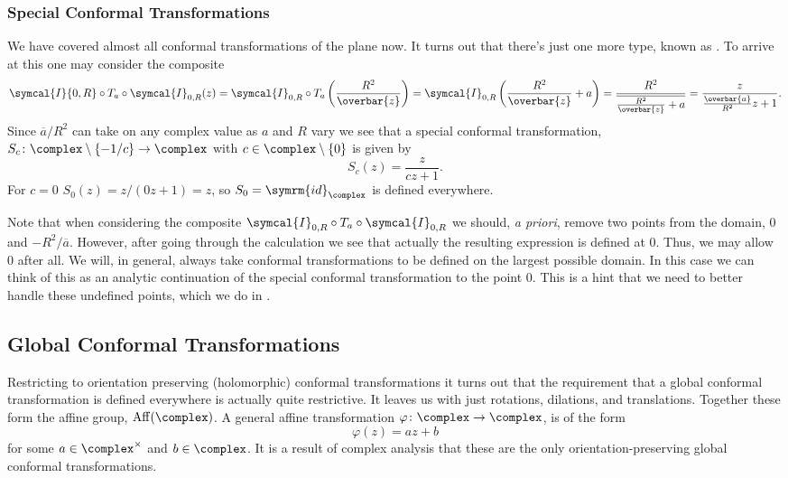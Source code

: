 \documentclass[fleqn]{NotesClass}
\DeclareMathOperator{\Aff}{Aff}
\newcommand{\inversion}{\symcal{I}}
\newcommand{\id}{\symrm{id}}
\begin{document}
    \subsubsection{Special Conformal Transformations}
    We have covered almost all conformal transformations of the plane now.
    It turns out that there's just one more type, known as .
    To arrive at this one may consider the composite
    \begin{equation}
        \inversion{0, R} \circ T_a \circ \inversion_{0, R}(z) = \inversion_{0, R} \circ T_a\left( \frac{R^2}{\overbar{z}} \right) = \inversion_{0, R}\left( \frac{R^2}{\overbar{z}} + a \right) = \frac{R^2}{\overline{\frac{R^2}{\overbar{z}} + a}} = \frac{z}{\frac{\overbar{a}}{R^2}z + 1}.
    \end{equation}
    Since \(\overbar{a}/R^2\) can take on any complex value as \(a\) and \(R\) vary we see that a special conformal transformation, \(S_c \colon \complex \setminus \{-1/c\} \to \complex\) with \(c \in \complex \setminus \{0\}\) is given by
    \begin{equation}
        S_c(z) = \frac{z}{cz + 1}.
    \end{equation}
    For \(c = 0\) \(S_0(z) = z/(0z + 1) = z\), so \(S_0 = \id_{\complex}\) is defined everywhere.
    
    Note that when considering the composite \(\inversion_{0, R} \circ T_a \circ \inversion_{0, R}\) we should, \textit{a priori}, remove two points from the domain, \(0\) and \(-R^2/\overbar{a}\).
    However, after going through the calculation we see that actually the resulting expression is defined at 0.
    Thus, we may allow 0 after all.
    We will, in general, always take conformal transformations to be defined on the largest possible domain.
    In this case we can think of this as an analytic continuation of the special conformal transformation to the point 0.
    This is a hint that we need to better handle these undefined points, which we do in . %
    
    \subsection{Global Conformal Transformations}
    Restricting to orientation preserving (holomorphic) conformal transformations it turns out that the requirement that a global conformal transformation is defined everywhere is actually quite restrictive.
    It leaves us with just rotations, dilations, and translations.
    Together these form the affine group, \(\Aff(\complex)\).
    A general affine transformation \(\varphi \colon \complex \to \complex\), is of the form
    \begin{equation}
        \varphi(z) = az + b
    \end{equation}
    for some \(a \in \complex^{\times}\) and \(b \in \complex\).
    It is a result of complex analysis that these are the only orientation-preserving global conformal transformations.
    
\end{document}
